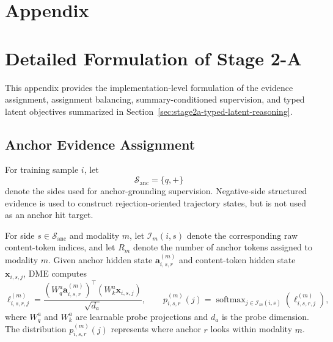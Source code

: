 
\clearpage


\section*{Appendix}

\section{Detailed Formulation of Stage 2-A}
\label{app:stage2a-details}

This appendix provides the implementation-level formulation of the evidence assignment, assignment balancing, summary-conditioned supervision, and typed latent objectives summarized in Section~\ref{sec:stage2a-typed-latent-reasoning}.

\subsection{Anchor Evidence Assignment}
\label{app:anchor-evidence-assignment}

For training sample $i$, let
\begin{equation}
    \mathcal{S}_{\mathrm{anc}}
    =
    \{q,+\}
\end{equation}
denote the sides used for anchor-grounding supervision. Negative-side structured evidence is used to construct rejection-oriented trajectory states, but is not used as an anchor hit target.

For side $s \in \mathcal{S}_{\mathrm{anc}}$ and modality $m$, let $\mathcal{I}_m(i,s)$ denote the corresponding raw content-token indices, and let $R_m$ denote the number of anchor tokens assigned to modality $m$. Given anchor hidden state $\mathbf{a}_{i,s,r}^{(m)}$ and content-token hidden state $\mathbf{x}_{i,s,j}$, DME computes
\begin{equation}
    \ell_{i,s,r,j}^{(m)}
    =
    \frac{
        \left(
            W_q^{a}
            \mathbf{a}_{i,s,r}^{(m)}
        \right)^{\top}
        \left(
            W_k^{a}
            \mathbf{x}_{i,s,j}
        \right)
    }{
        \sqrt{d_a}
    },
    \qquad
    p_{i,s,r}^{(m)}(j)
    =
    \operatorname{softmax}_{j \in \mathcal{I}_m(i,s)}
    \left(
        \ell_{i,s,r,j}^{(m)}
    \right),
\label{eq:app-anchor-probe}
\end{equation}
where $W_q^{a}$ and $W_k^{a}$ are learnable probe projections and $d_a$ is the probe dimension. The distribution $p_{i,s,r}^{(m)}(j)$ represents where anchor $r$ looks within modality $m$.

